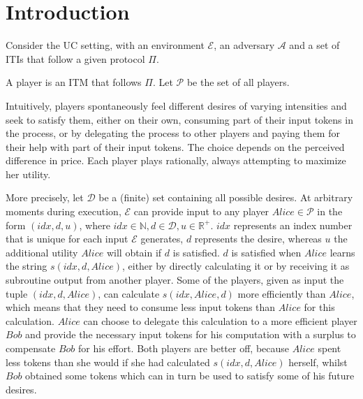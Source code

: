 \section{Introduction}
  Consider the UC setting, with an environment $\mathcal{E}$, an adversary $\mathcal{A}$ and a set of ITIs that follow a
  given protocol $\Pi$.

  \begin{definition}[Player]
    A player is an ITM that follows $\Pi$. Let $\mathcal{P}$ be the set of all players.
  \end{definition}

  Intuitively, players spontaneously feel different desires of varying intensities and seek to satisfy them, either on their
  own, consuming part of their input tokens in the process, or by delegating the process to other players and paying them for
  their help with part of their input tokens. The choice depends on the perceived difference in price. Each player plays
  rationally, always attempting to maximize her utility.
  
  More precisely, let $\mathcal{D}$ be a (finite) set containing all possible desires. At arbitrary moments during execution,
  $\mathcal{E}$ can provide input to any player $Alice \in \mathcal{P}$ in the form $\left(idx, d, u\right)$, where $idx \in
  \mathbb{N}, d \in \mathcal{D}, u \in \mathbb{R}^{+}$. $idx$ represents an index number that is unique for each input
  $\mathcal{E}$ generates, $d$ represents the desire, whereas $u$ the additional utility $Alice$ will obtain if $d$ is
  satisfied. $d$ is satisfied when $Alice$ learns the string $s\left(idx, d, Alice\right)$, either by directly calculating it
  or by receiving it as subroutine output from another player. Some of the players, given as input the tuple $\left(idx, d,
  Alice\right)$, can calculate $s\left(idx, Alice, d\right)$ more efficiently than $Alice$, which means that they need to
  consume less input tokens than $Alice$ for this calculation. $Alice$ can choose to delegate this calculation to a more
  efficient player $Bob$ and provide the necessary input tokens for his computation with a surplus to compensate $Bob$ for his
  effort. Both players are better off, because $Alice$ spent less tokens than she would if she had calculated $s\left(idx, d,
  Alice\right)$ herself, whilst $Bob$ obtained some tokens which can in turn be used to satisfy some of his future desires.

